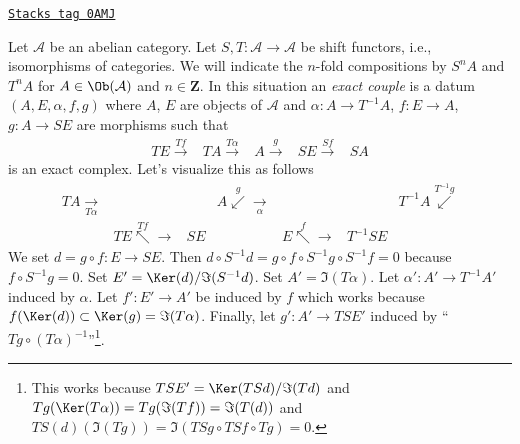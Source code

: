 \begin{remark}[Variant]

\label{homology-remark-shifted-exact-couple}
\href{https://stacks.math.columbia.edu/tag/0AMJ}{\texttt{Stacks tag 0AMJ}}

Let $\mathcal{A}$ be an abelian category. Let
$S, T : \mathcal{A} \to \mathcal{A}$ be shift
functors, i.e., isomorphisms of categories. We will indicate
the $n$-fold compositions by $S^nA$ and $T^nA$ for
$A \in \Ob(\mathcal{A})$ and $n \in \mathbf{Z}$.
In this situation an {\it exact couple} is a datum $(A, E, \alpha, f, g)$
where $A$, $E$ are objects of $\mathcal{A}$ and $\alpha : A \to T^{-1}A$,
$f : E \to A$, $g : A \to SE$ are morphisms such that
$$
\begin{array}{ccccc}TE \overset{Tf}{\longrightarrow} & TA \overset{T\alpha}{\longrightarrow} & A \overset{g}{\longrightarrow} & SE \overset{Sf}{\longrightarrow} & SA\end{array}
$$
is an exact complex. Let's visualize this as follows
$$
\begin{array}{ccccccc}TA \underset{T\alpha}{\longrightarrow} &  &  & A \overset{g}{\swarrow}\underset{\alpha}{\longrightarrow} &  &  & T^{-1}A \overset{T^{-1}g}{\swarrow} \\  & TE \overset{Tf}{\nwarrow}\longrightarrow & SE &  & E \overset{f}{\nwarrow}\longrightarrow & T^{-1}SE & \end{array}
$$
We set $d = g \circ f : E \to SE$. Then $d \circ S^{-1}d =
g \circ f \circ S^{-1}g \circ S^{-1}f = 0$ because $f \circ S^{-1}g = 0$.
Set $E' = \Ker(d)/\Im(S^{-1}d)$. Set $A' = \Im(T\alpha)$.
Let $\alpha' : A' \to T^{-1}A'$ induced by $\alpha$.
Let $f' : E' \to A'$ be induced by $f$ which works because
$f(\Ker(d)) \subset \Ker(g) = \Im(T\alpha)$.
Finally, let $g' : A' \to TSE'$ induced by
``$Tg \circ (T\alpha)^{-1}$''\footnote{This works because
$TSE' = \Ker(TSd)/\Im(Td)$ and
$Tg(\Ker(T\alpha)) = Tg(\Im(Tf)) = \Im(T(d))$
and $TS(d)(\Im(Tg)) = \Im(TSg \circ TSf \circ Tg) = 0$.}.


\end{remark}
